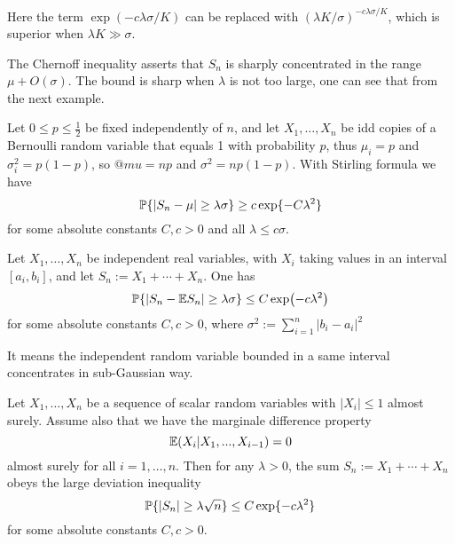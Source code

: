 Here the term $\exp(-c\lambda \sigma /K)$ can be replaced with $(\lambda K/\sigma)^{-c\lambda\sigma/K }$, which is superior when $\lambda K \gg \sigma$.

The Chernoff inequality asserts that $S_n$ is sharply concentrated in the range $\mu+O(\sigma)$. The bound is sharp when $\lambda$ is not too large, one can see that from the next example.

\begin{example}
    Let $0\leq p \leq \frac{1}{2}$ be fixed independently of $n$, and let $X_1,\dots,X_n$ be idd copies of a Bernoulli random variable that equals 1 with probability $p$, thus $\mu_i = p$ and $\sigma_i^2 = p(1-p)$, so $@mu = np$ and $\sigma^2 = np(1-p)$.
With Stirling formula we have
\begin{equation*}
    \mathbb{P} \{|S_n - \mu| \geq \lambda \sigma \} \geq c\exp \{-C\lambda^2 \}
\end{equation*}
for some absolute constants $C,c > 0$ and all $\lambda \leq c \sigma$.
\end{example}

\begin{proposition}
    \label{Hoeffding's inequality}
    Let $X_1,\dots,X_n$ be independent real variables, with $X_i$ taking values in an interval $[a_i,b_i]$, and let $S_n := X_1 + \cdots +X_n$. One has 
    \begin{equation*}
        \mathbb{P}\{|S_n - \mathbb{E} S_n|\geq \lambda\sigma \} \leq C\exp (-c\lambda^2)
    \end{equation*}
    for some absolute constants $C,c > 0 $, where $\sigma^2 := \sum_{i=1}^n |b_i-a_i|^2$
\end{proposition}

It means the independent random variable bounded in a same interval concentrates in sub-Gaussian way.

\begin{theorem}
    \label{Azuma's inequality}
    Let $X_1,\dots,X_n$ be a sequence of scalar random variables with $|X_i| \leq 1$ almost surely. Assume also that we have the marginale difference property
    \begin{equation}
        \mathbb{E} (X_i|X_1,...,X_{i-1}) = 0
    \end{equation}
    almost surely for all $i=1,\dots,n$. Then for any $\lambda >0$, the sum $S_n:=X_1 + \cdots +X_n$ obeys the large deviation inequality
    \begin{equation}
        \mathbb{P}\{|S_n|\geq \lambda \sqrt{n} \}  \leq C \exp \{-c\lambda^2 \}
    \end{equation}
    for some absolute constants $C,c > 0$.
\end{theorem}

